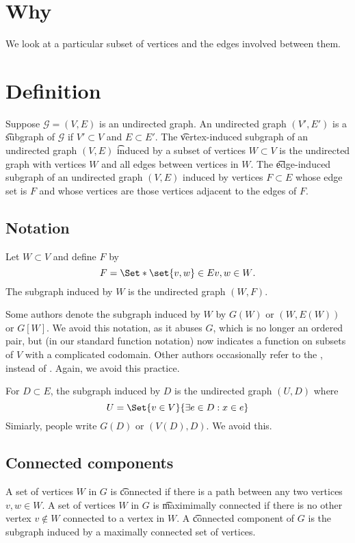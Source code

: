 

\section*{Why}

We look at a particular subset of vertices and the edges involved between them.

\section*{Definition}

Suppose $\mathcal{G}  = (V, E)$ is an undirected graph.
An undirected graph $(V', E')$ is a \t{subgraph} of $\mathcal{G} $ if $V' \subset V$ and $E \subset E'$.
The \t{vertex-induced subgraph} of an undirected graph $(V, E)$ \t{induced by} a subset of vertices $W \subset V$ is the undirected graph with vertices $W$ and all edges between vertices in $W$.
The \t{edge-induced subgraph} of an undirected graph $(V, E)$ induced by vertices $F \subset E$ whose edge set is $F$ and whose vertices are those vertices adjacent to the edges of $F$.

\subsection*{Notation}

Let $W \subset V$ and define $F$ by
    \[
F = \Set*{\set{v, w} \in E}{v, w \in W}.
    \]
The subgraph induced by $W$ is the undirected graph $(W, F)$.

Some authors denote the subgraph induced by $W$ by $G(W)$ or $(W, E(W))$ or $G[W]$.
We avoid this notation, as it abuses $G$, which is no longer an ordered pair, but (in our standard function notation) now indicates a function on subsets of $V$ with a complicated codomain.
Other authors occasionally refer to the , instead of .
Again, we avoid this practice.

For $D \subset E$, the subgraph induced by $D$ is the undirected graph $(U, D)$ where
    \[
U = \Set{v \in V}{\exists e \in D: x \in e}
    \]
Simiarly, people write $G(D)$ or $(V(D), D)$.
We avoid this.

\subsection*{Connected components}

A set of vertices $W$ in $G$ is \t{connected} if there is a path between any two vertices $v, w \in W$.
A set of vertices $W$ in $G$ is \t{maximimally connected} if there is no other vertex $v \not \in W$ connected to a vertex in $W$.
A \t{connected component} of $G$ is the subgraph induced by a maximally connected set of vertices.

